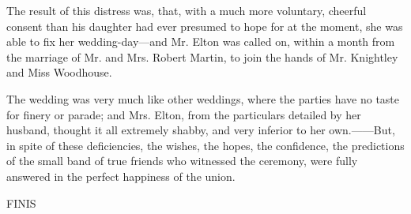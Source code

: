 The result of this distress was, that, with a much more voluntary, cheerful consent than his daughter had ever presumed to hope for at the moment, she was able to fix her wedding-day---and Mr. Elton was called on, within a month from the marriage of Mr. and Mrs. Robert Martin, to join the hands of Mr. Knightley and Miss Woodhouse.

The wedding was very much like other weddings, where the parties have no taste for finery or parade; and Mrs. Elton, from the particulars detailed by her husband, thought it all extremely shabby, and very inferior to her own.------But, in spite of these deficiencies, the wishes, the hopes, the confidence, the predictions of the small band of true friends who witnessed the ceremony, were fully answered in the perfect happiness of the union.

FINIS
